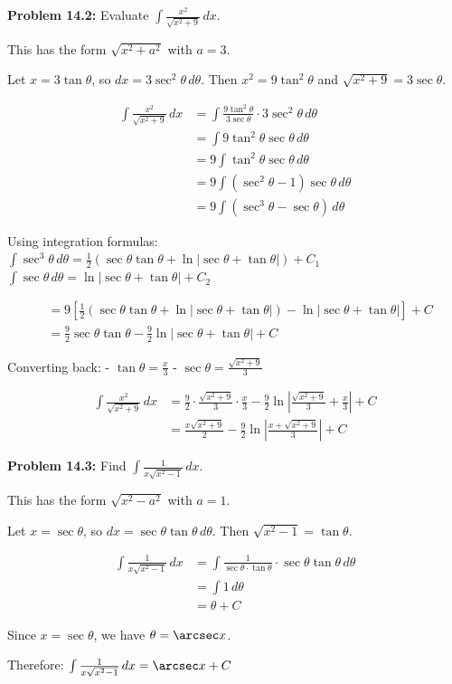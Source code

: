 \documentclass[12pt,a4paper]{book}
\theoremstyle{definition}
\begin{document}
\begin{solution}
\textbf{Problem 14.2:} Evaluate $\int \frac{x^2}{\sqrt{x^2 + 9}} \, dx$.

This has the form $\sqrt{x^2 + a^2}$ with $a = 3$.

Let $x = 3\tan\theta$, so $dx = 3\sec^2\theta \, d\theta$.
Then $x^2 = 9\tan^2\theta$ and $\sqrt{x^2 + 9} = 3\sec\theta$.

\begin{align}
\int \frac{x^2}{\sqrt{x^2 + 9}} \, dx &= \int \frac{9\tan^2\theta}{3\sec\theta} \cdot 3\sec^2\theta \, d\theta\\
&= \int 9\tan^2\theta \sec\theta \, d\theta\\
&= 9\int \tan^2\theta \sec\theta \, d\theta\\
&= 9\int (\sec^2\theta - 1)\sec\theta \, d\theta\\
&= 9\int (\sec^3\theta - \sec\theta) \, d\theta
\end{align}

Using integration formulas:
$\int \sec^3\theta \, d\theta = \frac{1}{2}(\sec\theta\tan\theta + \ln|\sec\theta + \tan\theta|) + C_1$
$\int \sec\theta \, d\theta = \ln|\sec\theta + \tan\theta| + C_2$

\begin{align}
&= 9\left[\frac{1}{2}(\sec\theta\tan\theta + \ln|\sec\theta + \tan\theta|) - \ln|\sec\theta + \tan\theta|\right] + C\\
&= \frac{9}{2}\sec\theta\tan\theta - \frac{9}{2}\ln|\sec\theta + \tan\theta| + C
\end{align}

Converting back:
- $\tan\theta = \frac{x}{3}$
- $\sec\theta = \frac{\sqrt{x^2+9}}{3}$

\begin{align}
\int \frac{x^2}{\sqrt{x^2 + 9}} \, dx &= \frac{9}{2} \cdot \frac{\sqrt{x^2+9}}{3} \cdot \frac{x}{3} - \frac{9}{2}\ln\left|\frac{\sqrt{x^2+9}}{3} + \frac{x}{3}\right| + C\\
&= \frac{x\sqrt{x^2+9}}{2} - \frac{9}{2}\ln\left|\frac{x + \sqrt{x^2+9}}{3}\right| + C
\end{align}
\end{solution}

\begin{solution}
\textbf{Problem 14.3:} Find $\int \frac{1}{x\sqrt{x^2 - 1}} \, dx$.

This has the form $\sqrt{x^2 - a^2}$ with $a = 1$.

Let $x = \sec\theta$, so $dx = \sec\theta\tan\theta \, d\theta$.
Then $\sqrt{x^2 - 1} = \tan\theta$.

\begin{align}
\int \frac{1}{x\sqrt{x^2 - 1}} \, dx &= \int \frac{1}{\sec\theta \cdot \tan\theta} \cdot \sec\theta\tan\theta \, d\theta\\
&= \int 1 \, d\theta\\
&= \theta + C
\end{align}

Since $x = \sec\theta$, we have $\theta = \arcsec x$.

Therefore: $\int \frac{1}{x\sqrt{x^2 - 1}} \, dx = \arcsec x + C$
\end{solution}
\end{document}
